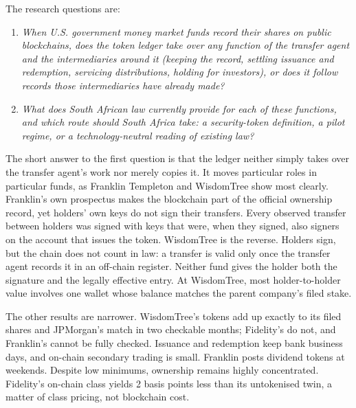 \documentclass[12pt,a4paper]{article}
\begin{document}
The research questions are:
\begin{enumerate}
\item \textit{When U.S. government money market funds record their shares on public blockchains, does the token ledger take over any function of the transfer agent and the intermediaries around it (keeping the record, settling issuance and redemption, servicing distributions, holding for investors), or does it follow records those intermediaries have already made?}
\item \textit{What does South African law currently provide for each of these functions, and which route should South Africa take: a security-token definition, a pilot regime, or a technology-neutral reading of existing law?}
\end{enumerate}

The short answer to the first question is that the ledger neither simply takes over the transfer agent's work nor merely copies it. It moves particular roles in particular funds, as Franklin Templeton and WisdomTree show most clearly. Franklin's own prospectus makes the blockchain part of the official ownership record, yet holders' own keys do not sign their transfers. Every observed transfer between holders was signed with keys that were, when they signed, also signers on the account that issues the token. WisdomTree is the reverse. Holders sign, but the chain does not count in law: a transfer is valid only once the transfer agent records it in an off-chain register. Neither fund gives the holder both the signature and the legally effective entry. At WisdomTree, most holder-to-holder value involves one wallet whose balance matches the parent company's filed stake.

The other results are narrower. WisdomTree's tokens add up exactly to its filed shares and JPMorgan's match in two checkable months; Fidelity's do not, and Franklin's cannot be fully checked. Issuance and redemption keep bank business days, and on-chain secondary trading is small. Franklin posts dividend tokens at weekends. Despite low minimums, ownership remains highly concentrated. Fidelity's on-chain class yields 2 basis points less than its untokenised twin, a matter of class pricing, not blockchain cost.
\end{document}
